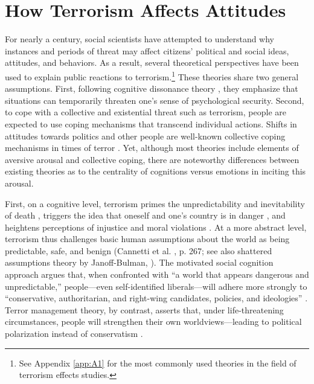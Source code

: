 \section{How Terrorism Affects Attitudes}
\label{sec:52}
For nearly a century, social scientists have attempted to understand why instances and periods of threat may affect citizens’ political and social ideas, attitudes, and behaviors. As a result, several theoretical perspectives have been used to explain public reactions to terrorism.\footnote{See Appendix \ref{app:A1} for the most commonly used theories in the field of terrorism effects studies.} These theories share two general assumptions. First, following cognitive dissonance theory \citep{Festinger1975}, they emphasize that situations can temporarily threaten one's sense of psychological security. Second, to cope with a collective and existential threat such as terrorism, people are expected to use coping mechanisms that transcend individual actions. Shifts in attitudes towards politics and other people are well-known collective coping mechanisms in times of terror \citep{Merolla2009a}. Yet, although most theories include elements of aversive arousal and collective coping, there are noteworthy differences between existing theories as to the centrality of cognitions versus emotions in inciting this arousal.


First, on a {cognitive} level, terrorism primes the unpredictability and inevitability of death \citep{Pyszczynski2003}, triggers the idea that oneself and one's country is in danger \citep{Jost2003, Huddy2002a}, and heightens perceptions of injustice and moral violations \citep{Lambert2019, Skitka2002}. At a more abstract level, terrorism thus challenges basic human assumptions about the world as being predictable, safe, and benign (Cannetti et al. \citeyear{Canetti2013a}, p. 267; see also shattered assumptions theory by Janoff-Bulman, \citeyear{Janoff-Bulman1992}). The {motivated social cognition} approach argues that, when confronted with ``a world that appears dangerous and unpredictable,'' people---even self-identified liberals---will adhere more strongly to ``conservative, authoritarian, and right-wing candidates, policies, and ideologies'' \citep[][pp. 326-327; see also Jost et al. \citeyear{Jost2003}]{Jost2017a}. Terror management theory, by contrast, asserts that, under life-threatening circumstances, people will strengthen their own worldviews---leading to political polarization instead of conservatism \citep{Pyszczynski2003}.


